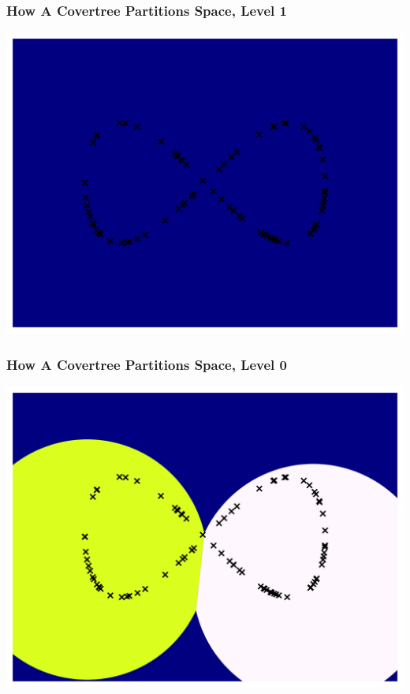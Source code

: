 \documentclass{beamer}
\begin{document}
\begin{frame}
\frametitle{How A Covertree Partitions Space, Level 1}
\begin{center}
    \includegraphics[scale=0.6]{partition_0.png}
\end{center}
\end{frame}

\begin{frame}
\frametitle{How A Covertree Partitions Space, Level 0}
\begin{center}
    \includegraphics[scale=0.6]{partition_1.png}
\end{center}
\end{frame}
\end{document}
